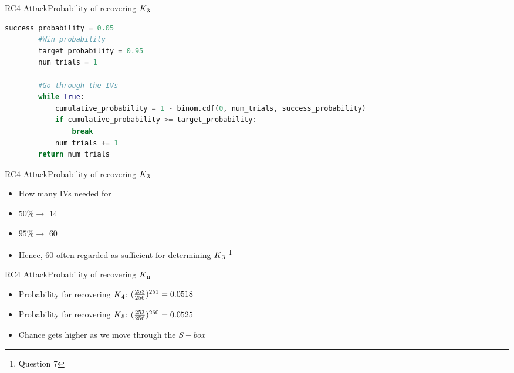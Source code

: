 \documentclass[
	aspectratio=169,	%
	onlytextwidth,		%
	t					%
	]{beamer}
\begin{document}
\begin{frame}[fragile]{RC4 Attack}{Probability of recovering $K\textsubscript{3}$}
	\begin{lstlisting}[language=Python]
		success_probability = 0.05
		#Win probability
		target_probability = 0.95
		num_trials = 1

		#Go through the IVs
		while True:
			cumulative_probability = 1 - binom.cdf(0, num_trials, success_probability)
			if cumulative_probability >= target_probability:
				break
			num_trials += 1
		return num_trials
	\end{lstlisting}
\end{frame}

\begin{frame}[fragile]{RC4 Attack}{Probability of recovering $K\textsubscript{3}$}
	\begin{itemize}
		\item How many IVs needed for 
		\item $50\% \rightarrow$ $14$
		\item $95\% \rightarrow$ $60$
		\item Hence, $60$ often regarded as sufficient for determining $K\textsubscript{3}$ \footnote[frame]{\footnotesize Question 7}
	\end{itemize}
\end{frame}

\begin{frame}[fragile]{RC4 Attack}{Probability of recovering $K\textsubscript{n}$}
	\begin{itemize}
		\item Probability for recovering $K\textsubscript{4}$: $(\frac{253}{256})\textsuperscript{251} = 0.0518$
		\item Probability for recovering $K\textsubscript{5}$: $(\frac{253}{256})\textsuperscript{250} = 0.0525$
		\item Chance gets higher as we move through the $S-box$
	\end{itemize}
\end{frame}
\end{document}

